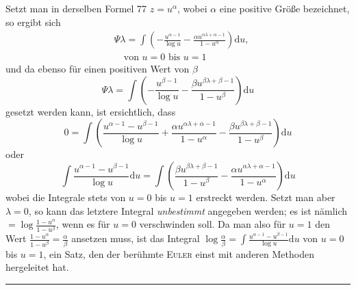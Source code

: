 Setzt man in derselben Formel 77 $z=u^\alpha$, wobei $\alpha$ eine positive Größe bezeichnet, so ergibt sich
\[
\begin{aligned}
&\Psi\lambda=\int\left(-\frac{u^{\alpha-1}}{\log u}
-\frac{\alpha u^{\alpha\lambda+\alpha-1}}{1-u^\alpha}\right)\mathrm{d}u,
\\[4pt]
&\quad\text{von }u=0\text{ bis }u=1
\end{aligned}
\]
und da ebenso für einen positiven Wert von $\beta$
\[
\Psi\lambda=\int\left(-\frac{u^{\beta-1}}{\log u}
-\frac{\beta u^{\beta\lambda+\beta-1}}{1-u^\beta}\right)\mathrm{d}u
\]
gesetzt werden kann, ist ersichtlich, dass
\[
0=\int\left(\frac{u^{\alpha-1}-u^{\beta-1}}{\log u}
+\frac{\alpha u^{\alpha\lambda+\alpha-1}}{1-u^\alpha}
-\frac{\beta u^{\beta\lambda+\beta-1}}{1-u^\beta}\right)\mathrm{d}u
\]
oder
\[
\int\frac{u^{\alpha-1}-u^{\beta-1}}{\log u}\mathrm{d}u
=\int\left(\frac{\beta u^{\beta\lambda+\beta-1}}{1-u^\beta}
-\frac{\alpha u^{\alpha\lambda+\alpha-1}}{1-u^\alpha}\right)\mathrm{d}u
\]
wobei die Integrale stets von $u=0$ bis $u=1$ erstreckt werden. Setzt man aber $\lambda=0$, so kann das letztere Integral \emph{unbestimmt} angegeben werden; es ist nämlich $=\log\frac{1-u^\alpha}{1-u^\beta}$, wenn es für $u=0$ verschwinden soll. Da man also für $u=1$ den Wert $\frac{1-u^\alpha}{1-u^\beta}=\frac{\alpha}{\beta}$ ansetzen muss, ist das Integral $\log\frac{\alpha}{\beta}=\int\frac{u^{\alpha-1}-u^{\beta-1}}{\log u}\mathrm{d}u$ von $u=0$ bis $u=1$, ein Satz, den der berühmte \textsc{Euler} einst mit anderen Methoden hergeleitet hat.
\par\medskip\noindent\hfill\rule{.25\linewidth}{.4pt}\hfill\par
